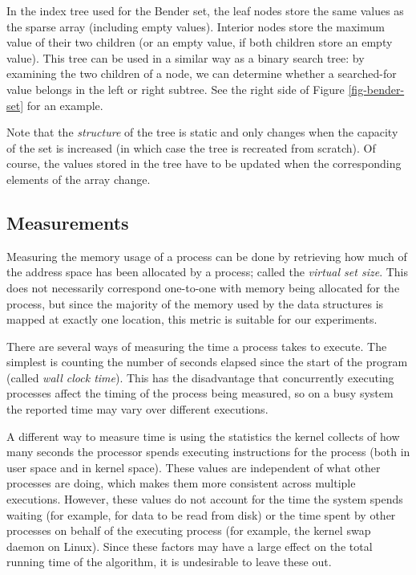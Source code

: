 \documentclass{acm_proc_article-sp}
\begin{document}
In the index tree used for the Bender set, the leaf nodes store the same values
as the sparse array (including empty values).
Interior nodes store the maximum value of their two children (or an empty value,
if both children store an empty value).
This tree can be used in a similar way as a binary search tree: by examining the
two children of a node, we can determine whether a searched-for value belongs
in the left or right subtree.
See the right side of Figure \ref{fig-bender-set} for an example.

Note that the \emph{structure} of the tree is static and only changes when the
capacity of the set is increased (in which case the tree is recreated from scratch).
Of course, the values stored in the tree have to be updated when the corresponding
elements of the array change.

\subsection{Measurements}
Measuring the memory usage of a process can be done by retrieving how much of the
address space has been allocated by a process; called the \emph{virtual set
size}. This does not necessarily correspond one-to-one with memory being allocated
for the process, but since the majority of the memory used by the
data structures is mapped at exactly one location, this metric is suitable
for our experiments.

There are several ways of measuring the time a process takes to execute.
The simplest is counting the number of seconds elapsed since the start of the
program (called \emph{wall clock time}).
This has the disadvantage that concurrently executing processes affect the timing
of the process being measured, so on a busy system the reported time may vary
over different executions.

A different way to measure time is using the statistics the kernel collects
of how many seconds the processor spends executing instructions for the process
(both in user space and in kernel space). These values are independent of
what other processes are doing, which makes them more consistent across
multiple executions. However, these values do not account for the time the
system spends waiting (for example, for data to be read from disk)
or the time spent by other processes on behalf of the executing process
(for example, the kernel swap daemon on Linux). Since these factors may have
a large effect on the total running time of the algorithm, it is undesirable
to leave these out.
\end{document}
